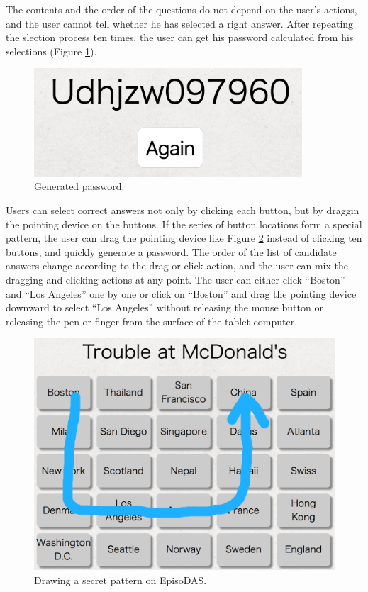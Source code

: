 \documentclass[sigconf]{acmart}
\begin{document}
The contents and the order of the questions
do not depend on the user's actions, and
the user cannot tell whether he has selected a right answer.
%
After repeating the slection process ten times,
the user can get his password
calculated from his selections (Figure \ref{Result}).

\begin{figure}
  \includegraphics[width=10cm,bb=0 0 1160 468]{figures/result.png}
  \caption{Generated password.}
  \label{Result}
\end{figure}

Users can select correct answers not only by clicking each button,
but by draggin the pointing device on the buttons.
%
If the series of button locations form a special pattern,
the user can drag the pointing device like
Figure \ref{draw} instead of clicking ten buttons,
and quickly generate a password.
%
The order of the list of candidate answers change according to the
drag or click action,
and the user can mix the dragging and clicking actions at any point.
The user can either click ``Boston'' and ``Los Angeles'' one by one or
click on ``Boston'' and drag the pointing device downward to select
``Los Angeles'' without releasing the mouse button or releasing the
pen or finger from the surface of the tablet computer.

\begin{figure}[H]
  \includegraphics[width=12cm,bb=0 0 1356 1046]{figures/draw.png}
  \caption{Drawing a secret pattern on EpisoDAS.}
  \label{draw}
\end{figure}
\end{document}
